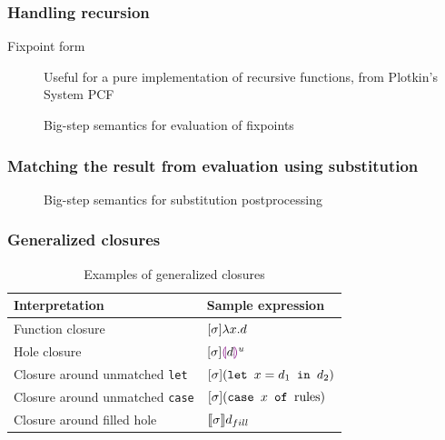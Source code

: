 \documentclass{beamer}
\begin{document}
\begin{frame}
  \frametitle{Handling recursion}

  \begin{description}
  \item[Fixpoint form] Useful for a pure implementation of recursive functions, from Plotkin's System PCF
  \end{description}
  
  \begin{figure}
    \footnotesize
    \centering
    
    \caption{Big-step semantics for evaluation of fixpoints}
    \label{fig:fixpoint-rules}
  \end{figure}
\end{frame}

\begin{frame}
  \frametitle{Matching the result from evaluation using substitution}

  \begin{figure}
    \centering
    \tiny
    \renewcommand{\judgboxfontsize}{\tiny}
    
    \caption{Big-step semantics for substitution postprocessing}
    \label{fig:pplc-rules}
  \end{figure}
\end{frame}

\begin{frame}
  \frametitle{Generalized closures}

  \begin{table}
    \centering
    \begin{tabular}{l|l}
      \hline
      Interpretation & Sample expression \\
      \hline\hline
      Function closure & $[\sigma]\lambda x.d$ \\
      Hole closure & $[\sigma]\textcolor{violet}{\llparenthesis} d\textcolor{violet}{\rrparenthesis}^u$ \\
      Closure around unmatched \texttt{let} & $[\sigma](\texttt{let }x=d_1\texttt{ in }d_2)$ \\
      Closure around unmatched \texttt{case} & $[\sigma](\texttt{case }x\texttt{ of }\text{rules})$ \\
      Closure around filled hole & $\llbracket\sigma\rrbracket d_{fill}$ \\
      \hline\hline
    \end{tabular}
    \caption{Examples of generalized closures}
    \label{tab:generaized-closures-examples}
  \end{table}
  
\end{frame}
\end{document}
